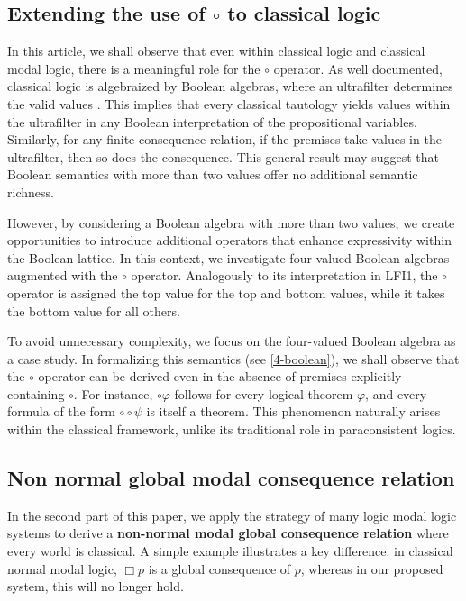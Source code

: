 \documentclass{amsart}
\begin{document}
\subsection{Extending the use of \texorpdfstring{$\circ$}{consistency operator} to classical logic} 

In this article, we shall observe that even within classical logic and classical modal logic, there is a meaningful role for the $\circ$ operator. As well documented, classical logic is algebraized by Boolean algebras, where an ultrafilter determines the valid values \cite{blok_algebraizable_1989}. This implies that every classical tautology yields values within the ultrafilter in any Boolean interpretation of the propositional variables. Similarly, for any finite consequence relation, if the premises take values in the ultrafilter, then so does the consequence. This general result may suggest that Boolean semantics with more than two values offer no additional semantic richness.

However, by considering a Boolean algebra with more than two values, we create opportunities to introduce additional operators that enhance expressivity within the Boolean lattice. In this context, we investigate four-valued Boolean algebras augmented with the $\circ$ operator. Analogously to its interpretation in LFI1, the $\circ$ operator is assigned the top value for the top and bottom values, while it takes the bottom value for all others.

To avoid unnecessary complexity, we focus on the four-valued Boolean algebra as a case study. In formalizing this semantics (see \cref{4-boolean}), we shall observe that the $\circ$ operator can be derived even in the absence of premises explicitly containing $\circ$. For instance, $\circ \varphi$ follows for every logical theorem $\varphi$, and every formula of the form $\circ \circ \psi$ is itself a theorem. This phenomenon naturally arises within the classical framework, unlike its traditional role in paraconsistent logics.

\subsection{Non normal global modal consequence relation}

In the second part of this paper, we apply the strategy of many logic modal logic systems \cite{freire_modality_2024} to derive a \textbf{non-normal modal global consequence relation} where every world is classical. A simple example illustrates a key difference: in classical normal modal logic, $\Box p$ is a global consequence of $p$, whereas in our proposed system, this will no longer hold.
\end{document}
